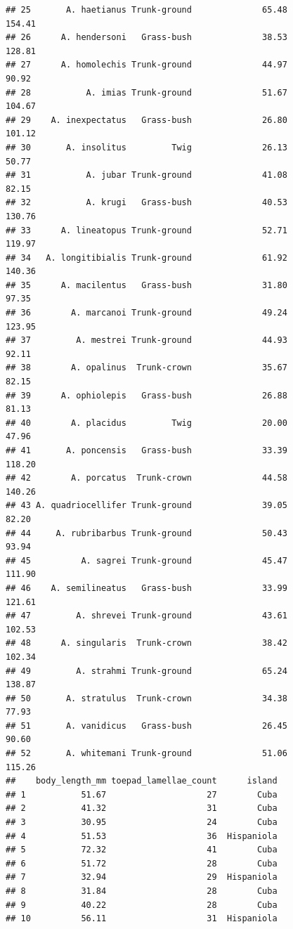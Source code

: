 \documentclass[
]{article}
\begin{document}
\begin{verbatim}
## 25       A. haetianus Trunk-ground              65.48         154.41
## 26      A. hendersoni   Grass-bush              38.53         128.81
## 27      A. homolechis Trunk-ground              44.97          90.92
## 28           A. imias Trunk-ground              51.67         104.67
## 29    A. inexpectatus   Grass-bush              26.80         101.12
## 30       A. insolitus         Twig              26.13          50.77
## 31           A. jubar Trunk-ground              41.08          82.15
## 32           A. krugi   Grass-bush              40.53         130.76
## 33      A. lineatopus Trunk-ground              52.71         119.97
## 34   A. longitibialis Trunk-ground              61.92         140.36
## 35      A. macilentus   Grass-bush              31.80          97.35
## 36        A. marcanoi Trunk-ground              49.24         123.95
## 37         A. mestrei Trunk-ground              44.93          92.11
## 38        A. opalinus  Trunk-crown              35.67          82.15
## 39      A. ophiolepis   Grass-bush              26.88          81.13
## 40        A. placidus         Twig              20.00          47.96
## 41       A. poncensis   Grass-bush              33.39         118.20
## 42        A. porcatus  Trunk-crown              44.58         140.26
## 43 A. quadriocellifer Trunk-ground              39.05          82.20
## 44     A. rubribarbus Trunk-ground              50.43          93.94
## 45          A. sagrei Trunk-ground              45.47         111.90
## 46    A. semilineatus   Grass-bush              33.99         121.61
## 47         A. shrevei Trunk-ground              43.61         102.53
## 48      A. singularis  Trunk-crown              38.42         102.34
## 49         A. strahmi Trunk-ground              65.24         138.87
## 50       A. stratulus  Trunk-crown              34.38          77.93
## 51       A. vanidicus   Grass-bush              26.45          90.60
## 52       A. whitemani Trunk-ground              51.06         115.26
##    body_length_mm toepad_lamellae_count      island
## 1           51.67                    27        Cuba
## 2           41.32                    31        Cuba
## 3           30.95                    24        Cuba
## 4           51.53                    36  Hispaniola
## 5           72.32                    41        Cuba
## 6           51.72                    28        Cuba
## 7           32.94                    29  Hispaniola
## 8           31.84                    28        Cuba
## 9           40.22                    28        Cuba
## 10          56.11                    31  Hispaniola

\end{verbatim}
\end{document}
